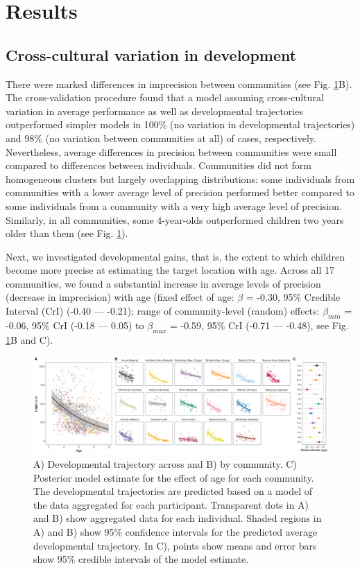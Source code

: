 \documentclass[
  man,floatsintext]{apa7}
\begin{document}
\section{Results}\label{results}

\subsection{Cross-cultural variation in development}\label{cross-cultural-variation-in-development}

There were marked differences in imprecision between communities (see Fig. \ref{fig:fig2}B). The cross-validation procedure found that a model assuming cross-cultural variation in average performance as well as developmental trajectories outperformed simpler models in 100\% (no variation in developmental trajectories) and 98\% (no variation between communities at all) of cases, respectively. Nevertheless, average differences in precision between communities were small compared to differences between individuals. Communities did not form homogeneous clusters but largely overlapping distributions: some individuals from communities with a lower average level of precision performed better compared to some individuals from a community with a very high average level of precision. Similarly, in all communities, some 4-year-olds outperformed children two years older than them (see Fig. \ref{fig:fig2}).

Next, we investigated developmental gains, that is, the extent to which children become more precise at estimating the target location with age. Across all 17 communities, we found a substantial increase in average levels of precision (decrease in imprecision) with age (fixed effect of age: \(\beta\) = -0.30, 95\% Credible Interval (CrI) (-0.40 --- -0.21); range of community-level (random) effects: \(\beta_{min}\) = -0.06, 95\% CrI (-0.18 --- 0.05) to \(\beta_{max}\) = -0.59, 95\% CrI (-0.71 --- -0.48), see Fig. \ref{fig:fig2}B and C).

\begin{figure}
\includegraphics[width=1\linewidth]{../figures/pdev} \caption{A) Developmental trajectory across and B) by community. C) Posterior model estimate for the effect of age for each community. The developmental trajectories are predicted based on a model of the data aggregated for each participant. Transparent dots in A) and B) show aggregated data for each individual. Shaded regions in A) and B) show 95\% confidence intervals for the predicted average developmental trajectory. In C), points show means and error bars show 95\% credible intervals of the model estimate.}\label{fig:fig2}
\end{figure}
\end{document}
